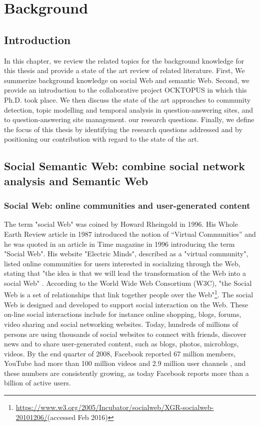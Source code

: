 \chapter{Background}
\doublespacing
\label{chap:background}
\minitoc


\section{Introduction}
In this chapter, we review the related topics for the background knowledge for this thesis and provide a state of the art review of related literature. First, We summerize background knowledge on social Web and semantic Web.
Second, we provide an introduction to the collaborative project OCKTOPUS in which this Ph.D. took place.
We then discuss the state of the art approaches to community detection, topic modelling and temporal analysis in question-answering sites, and to question-answering site management. 
our research questions.
Finally, we define the focus of this thesis by identifying the research questions addressed and by  positioning our contribution with regard to the state of the art.

\section{Social Semantic Web: combine social network analysis and Semantic Web}

\subsection{Social Web: online communities and user-generated content}
The term "social Web" was coined by Howard Rheingold in 1996. His Whole Earth Review article in 1987 introduced the notion of “Virtual Communities” and he was quoted in an article in Time magazine in 1996 introducing the term "Social Web". His website "Electric Minds", described as a "virtual community", listed online communities for users interested in socializing through the Web, stating that "the idea is that we will lead the transformation of the Web into a social Web" \cite{rheingold2000virtual}. According to the World Wide Web Consortium (W3C), "the Social Web is a set of relationships that link together people over the Web"\footnote{\url{https://www.w3.org/2005/Incubator/socialweb/XGR-socialweb-20101206/}(accessed Feb 2016)}. The social Web is designed and developed to support social interaction  \cite{porter2010designing} on the Web. These on-line social interactions include for instance online shopping, blogs, forums, video sharing and social networking websites. Today, hundreds of millions of persons are using thousands of social websites to connect with friends, discover news and to share user-generated content, such as blogs, photos, microblogs, videos. By the end quarter of 2008, Facebook reported 67 million members, YouTube had more than 100 million videos and 2.9 million user channels  \cite{watson2008causewired}, and these numbers are consistently growing, as today Facebook reports more than a billion of active users.  


